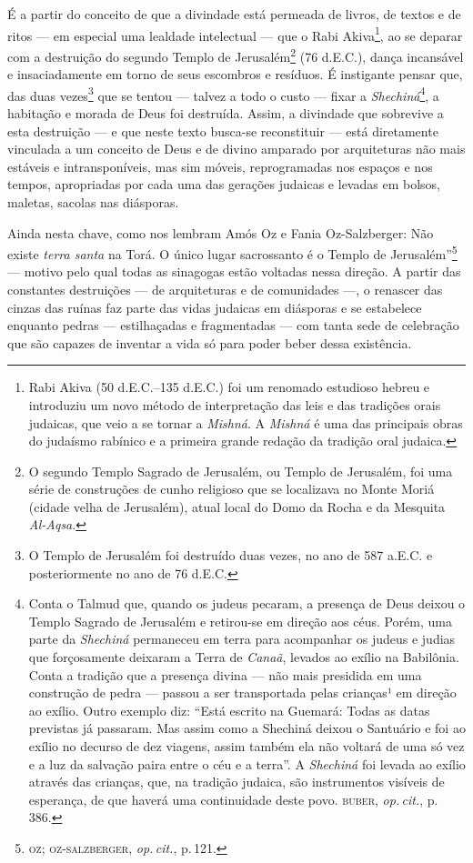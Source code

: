 É a partir do conceito de que a divindade está permeada de livros, de
textos e de ritos --- em especial uma lealdade intelectual --- que o
Rabi Akiva\footnote{Rabi Akiva (50 d.E.C.--135 d.E.C.) foi um renomado
  estudioso hebreu e introduziu um novo método de interpretação das leis
  e das tradições orais judaicas, que veio a se tornar a \emph{Mishná}. A \emph{Mishná} é uma das principais obras do judaísmo rabínico
  e a primeira grande redação da tradição oral judaica.}, ao se deparar
com a destruição do segundo Templo de Jerusalém\footnote{O segundo
  Templo Sagrado de Jerusalém, ou Templo de Jerusalém, foi uma série de
  construções de cunho religioso que se localizava no Monte
Moriá (cidade velha de Jerusalém), atual local do Domo da
  Rocha e da Mesquita \emph{Al-Aqsa}.} (76 d.E.C.), dança incansável e
insaciadamente em torno de seus escombros e resíduos. É instigante
pensar que, das duas vezes\footnote{O Templo de Jerusalém foi destruído
  duas vezes, no ano de 587 a.E.C. e posteriormente no ano de 76 d.E.C.}
que se tentou --- talvez a todo o custo --- fixar a
\emph{Shechiná}\footnote{Conta o Talmud que, quando os judeus
  pecaram, a presença de Deus deixou o Templo Sagrado de Jerusalém e
  retirou-se em direção aos céus. Porém, uma parte da \emph{Shechiná}
  permaneceu em terra para acompanhar os judeus e judias que
  forçosamente deixaram a Terra de \emph{Canaã}, levados ao exílio na
  Babilônia. Conta a tradição que a presença divina --- não mais
  presidida em uma construção de pedra --- passou a ser transportada
  pelas crianças¹ em direção ao exílio. Outro exemplo diz: ``Está
  escrito na Guemará: Todas as datas previstas já passaram. Mas assim
  como a Shechiná deixou o Santuário e foi ao exílio no decurso de dez
  viagens, assim também ela não voltará de uma só vez e a luz da
  salvação paira entre o céu e a terra''. A \emph{Shechiná} foi levada ao exílio através das crianças,
  que, na tradição judaica, são instrumentos visíveis de esperança, de
  que haverá uma continuidade deste povo. \textsc{buber}, \emph{op.\,cit.}, p.\,386.}, a habitação e morada de Deus foi
destruída. Assim, a divindade que sobrevive a esta destruição --- e que
neste texto busca-se reconstituir --- está diretamente vinculada a um
conceito de Deus e de divino amparado por arquiteturas não mais estáveis
e intransponíveis, mas sim móveis, reprogramadas nos espaços e nos
tempos, apropriadas por cada uma das gerações judaicas e levadas em
bolsos, maletas, sacolas nas diásporas.

Ainda nesta chave, como nos lembram Amós Oz e Fania Oz-Salzberger:
Não existe \emph{terra santa} na Torá. O único lugar sacrossanto é o
Templo de Jerusalém''\footnote{\textsc{oz; oz-salzberger}, \emph{op.\,cit.}, p.\,121.}
--- motivo pelo qual todas as sinagogas estão voltadas nessa direção. A
partir das constantes destruições --- de arquiteturas e de comunidades
---, o renascer das cinzas das ruínas faz parte das vidas judaicas em
diásporas e se estabelece enquanto pedras --- estilhaçadas e
fragmentadas --- com tanta sede de celebração que são capazes de
inventar a vida só para poder beber dessa existência. 

